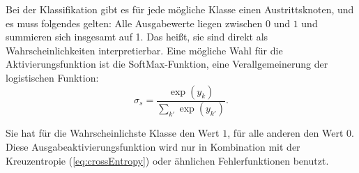 Bei der Klassifikation gibt es für jede mögliche Klasse einen Austrittsknoten, und es muss folgendes gelten:
Alle Ausgabewerte liegen zwischen $0$ und $1$ und summieren sich insgesamt auf 1.
Das heißt, sie sind direkt als Wahrscheinlichkeiten interpretierbar. Eine mögliche Wahl für die Aktivierungsfunktion ist die SoftMax-Funktion, eine Verallgemeinerung der logistischen Funktion:
\begin{equation}
\label{eq:softmax}
	\sigma_s = \frac{\exp (y_k)}{\sum_{k'} \exp (y_{k'})}.
\end{equation}

Sie hat für die Wahrscheinlichste Klasse den Wert $1$, für alle anderen den Wert $0$. Diese Ausgabeaktivierungsfunktion wird nur in Kombination mit der Kreuzentropie (\ref{eq:crossEntropy}) oder ähnlichen Fehlerfunktionen benutzt\cite{bishop1995neural}. 

